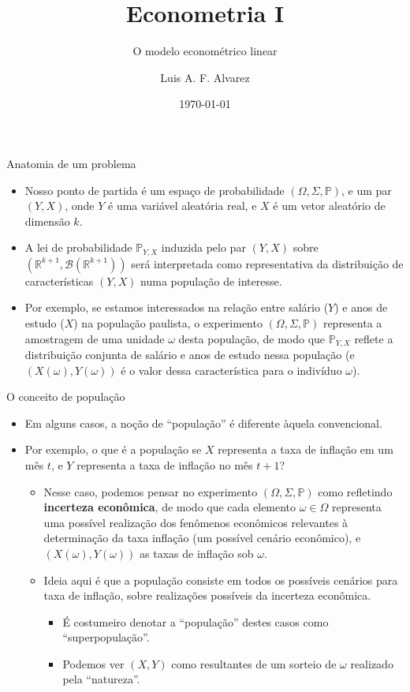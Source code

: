 \documentclass[11pt]{beamer}
\author{Luis A. F. Alvarez}
\title{Econometria I}
\subtitle{O modelo econométrico linear}
\date{\today}
\begin{document}
\begin{frame}[plain]
	\maketitle
\end{frame}

\begin{frame}{Anatomia de um problema}
	\begin{itemize}
		\item Nosso ponto de partida é um espaço de probabilidade $(\Omega, \Sigma,\mathbb{P})$, e um par $(Y,X)$, onde $Y$ é uma variável aleatória real, e $X$ é um vetor aleatório de dimensão $k$.
		\item A lei de probabilidade $\mathbb{P}_{Y,X}$ induzida pelo par $(Y,X)$ sobre $(\mathbb{R}^{k+1}, \mathcal{B}(\mathbb{R}^{k+1}))$ será interpretada como representativa da distribuição de características $(Y,X)$ numa população de interesse.
			\item Por exemplo, se estamos interessados na relação entre salário ($Y$) e anos de estudo ($X$) na população paulista, o experimento $(\Omega, \Sigma,\mathbb{P})$ representa a amostragem de uma unidade $\omega$ desta população, de modo que  $\mathbb{P}_{Y,X}$ reflete a distribuição conjunta de salário e anos de estudo nessa população (e $(X(\omega),Y(\omega))$ é o valor dessa característica para o indivíduo $\omega$).

		
	\end{itemize}
\end{frame}

\begin{frame}{O conceito de população}
	\begin{itemize}
\item Em alguns casos, a noção de ``população'' é diferente àquela convencional. 
\item Por exemplo, o que é a população se $X$ representa a taxa de inflação em um mês $t$, e $Y$ representa a taxa de inflação no mês $t+1$?
\begin{itemize}
	\item Nesse caso, podemos pensar no experimento $(\Omega, \Sigma,\mathbb{P})$ como refletindo \textbf{incerteza econômica}, de modo que cada elemento $\omega \in \Omega$ representa uma possível realização dos fenômenos econômicos relevantes à determinação da taxa  inflação (um possível cenário econômico), e $(X(\omega),Y(\omega))$ as taxas de inflação sob $\omega$.
	\item Ideia aqui é que a população consiste em todos os possíveis cenários para taxa de inflação, sobre realizações possíveis da incerteza econômica.
	\begin{itemize}
		\item É costumeiro denotar a ``população'' destes casos como ``superpopulação''. 
		\item Podemos ver $(X,Y)$ como resultantes de um sorteio de $\omega$ realizado pela ``natureza''.
	\end{itemize}
\end{itemize}
\end{itemize}
\end{frame}
\end{document}
